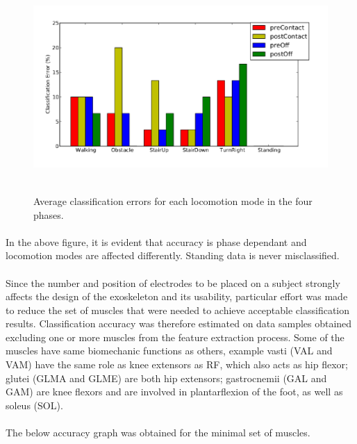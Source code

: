 \documentclass[12pt]{article}
\begin{document}
\begin{figure}[h]
	\begin{center}
		\includegraphics[height=8cm,width=15cm]{Error}
	\end{center}
	\caption{Average classification errors for each locomotion mode in the four phases.}
\end{figure}

\paragraph{}
In the above figure, it is evident that accuracy is phase dependant and locomotion modes are affected differently. Standing data is never misclassified.

\paragraph{}
Since the number and position of electrodes to be placed on a subject strongly affects the design of the exoskeleton and its usability, particular effort was made to reduce
the set of muscles that were needed to achieve acceptable classification results. Classification accuracy was therefore estimated on data samples obtained excluding one or more muscles from the feature extraction process. Some of the muscles have same biomechanic functions as others, example vasti (VAL and VAM) have the same role as knee extensors as RF, which also acts as hip flexor; glutei (GLMA and GLME) are both hip extensors; gastrocnemii (GAL and GAM) are knee flexors and are involved in plantarflexion of the foot, as well as soleus (SOL).

\paragraph{}
The below accuracy graph was obtained for the minimal set of muscles.
\end{document}
